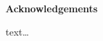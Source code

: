 \thispagestyle{empty}
\begin{center}
\vspace*{1.5cm}
\textbf{\large Acknowledgements}
\end{center}

text\ldots